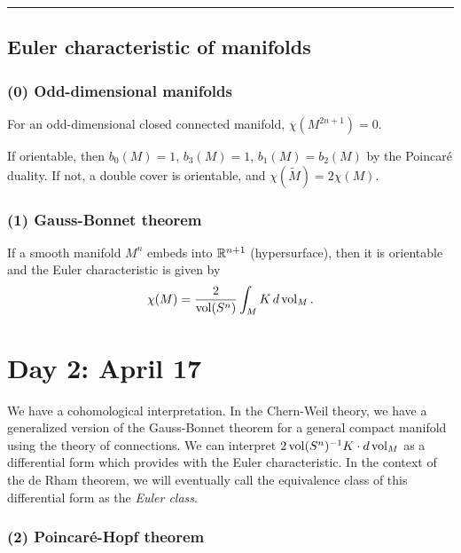 \documentclass{../../../small}
\begin{document}
\smallskip\hrule

\subsection*{Euler characteristic of manifolds}

\subsubsection*{(0) Odd-dimensional manifolds}

\begin{thm*}
For an odd-dimensional closed connected manifold, $\chi(M^{2n+1})=0$.
\end{thm*}
\begin{pf}
If orientable, then $b_0(M)=1$, $b_3(M)=1$, $b_1(M)=b_2(M)$ by the Poincar\'e duality.
If not, a double cover is orientable, and $\chi(\tilde M)=2\chi(M)$.
\end{pf}


\subsubsection*{(1) Gauss-Bonnet theorem}
\begin{thm*}
If a smooth manifold $M^n$ embeds into $\mathbb{R}^{n+1}$ (hypersurface), then it is orientable and the Euler characteristic is given by
\[\chi(M)=\frac2{\operatorname{vol}(S^n)}\int_MK\,d\operatorname{vol}_M.\]
\end{thm*}





\section{Day 2: April 17}

We have a cohomological interpretation.
In the Chern-Weil theory, we have a generalized version of the Gauss-Bonnet theorem for a general compact manifold using the theory of connections.
We can interpret $2\operatorname{vol}(S^n)^{-1}K\cdot d\operatorname{vol}_M$ as a differential form which provides with the Euler characteristic.
In the context of the de Rham theorem, we will eventually call the equivalence class of this differential form as the \emph{Euler class}.

\subsubsection*{(2) Poincar\'e-Hopf theorem}
\end{document}
